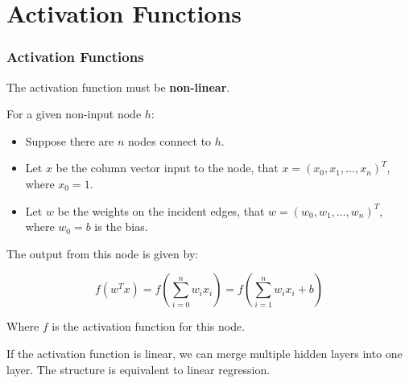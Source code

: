 \documentclass[aspectratio=169, 10pt]{beamer}
\begin{document}
\section{Activation Functions}
\begin{frame}
    \frametitle{Activation Functions}
    
    The activation function must be \textbf{non-linear}.\break

    For a given non-input node $h$:
    \begin{itemize}
        \item Suppose there are $n$ nodes connect to $h$.
        \item Let $x$ be the column vector input to the node, that $x = (x_0, x_1, \ldots, x_n)^T$, where $x_0=1$.
        \item Let $w$ be the weights on the incident edges, that $w = (w_0, w_1, \ldots, w_n)^T$, where $w_0=b$ is the bias.
    \end{itemize}

    The output from this node is given by:

    \[
        f(w^T x) = f(\sum_{i=0}^n w_i x_i) = f(\sum_{i=1}^n w_i x_i + b)
    \]

    Where $f$ is the activation function for this node.\break

    If the activation function is linear, we can merge multiple hidden layers into one layer.
    The structure is equivalent to linear regression.
\end{frame}
\end{document}
